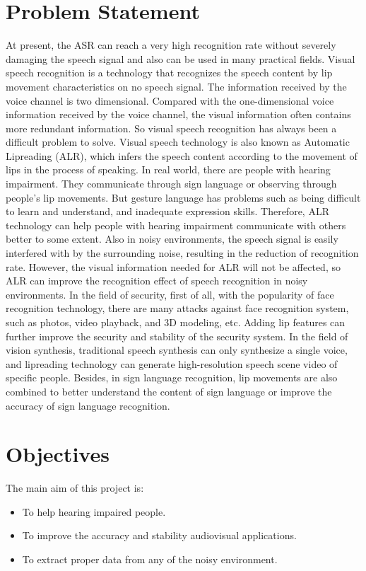 \section{Problem Statement}
	At present, the ASR can reach a very high recognition rate without severely damaging the speech signal and also can be used in many practical fields. Visual speech recognition is a technology that recognizes the speech content by lip movement characteristics on no speech signal. The information received by the voice channel is two dimensional. Compared with the one-dimensional voice information received by the voice channel, the visual information often contains more redundant information. So visual speech recognition has always been a difficult problem to solve. Visual speech technology is also known as Automatic Lipreading (ALR), which infers the speech content according to the movement of lips in the process of speaking. In real world, there are people with hearing impairment. They communicate through sign language or observing through people’s lip movements. But gesture language has problems such as being difficult to learn and understand, and inadequate expression skills. Therefore, ALR technology can help people with hearing impairment communicate with others better to some extent. Also in noisy environments, the speech signal is easily interfered with by the surrounding noise, resulting in the reduction of recognition rate. However, the visual information needed for ALR will not be affected, so ALR can improve the recognition effect of speech recognition in noisy environments. In the field of security, first of all, with the popularity of face recognition technology, there are many attacks against face recognition system, such as photos, video playback, and 3D modeling, etc. Adding lip features can further improve the security and stability of the security system. In the field of vision synthesis, traditional speech synthesis can only synthesize a single voice, and lipreading technology can generate high-resolution speech scene video of specific people. Besides, in sign language recognition, lip movements are also combined to better understand the content of sign language or improve the accuracy of sign language recognition. 

\section{Objectives}
	The main aim of this project is:
\begin{itemize}
	\item To help hearing impaired people.
	\item To improve the accuracy and stability audiovisual applications. 
	\item To extract proper data from any of the noisy environment.
\end{itemize}	
	

